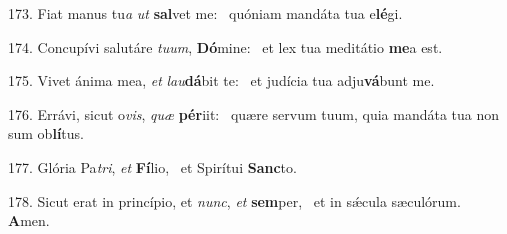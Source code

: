 173. Fiat manus tu\textit{a} \textit{ut} \textbf{sal}vet me: \ast\  quóniam mandáta tua e\textbf{lé}gi.\

174. Concupívi salutáre \textit{tu}\textit{um}, \textbf{Dó}mine: \ast\  et lex tua meditátio \textbf{me}a est.\

175. Vivet ánima mea, \textit{et} \textit{lau}\textbf{dá}bit te: \ast\  et judícia tua adju\textbf{vá}bunt me.\

176. Errávi, sicut o\textit{vis}, \textit{quæ} \textbf{pér}iit: \ast\  quære servum tuum, quia mandáta tua non sum ob\textbf{lí}tus.\

177. Glória Pa\textit{tri}, \textit{et} \textbf{Fí}lio, \ast\  et Spirítui \textbf{Sanc}to.\

178. Sicut erat in princípio, et \textit{nunc}, \textit{et} \textbf{sem}per, \ast\  et in sǽcula sæculórum. \textbf{A}men.\

